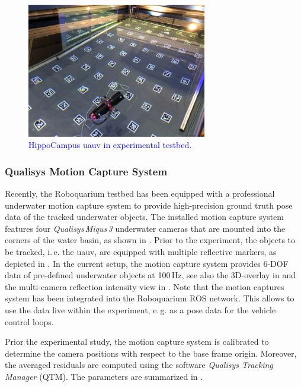 \begin{figure}
    \centering
    \includegraphics[width=0.7\textwidth]{images/04/hippo_in_tank.png}
    \caption{\textcolor{blue}{HippoCampus \ac{uauv} in experimental testbed.}}
    \label{fig:my_label}
\end{figure}


\subsubsection*{Qualisys Motion Capture System}
Recently, the Roboquarium testbed has been equipped with a professional underwater motion capture system to provide high-precision ground truth pose data of the tracked underwater objects.
The installed motion capture system features four \textit{Qualisys\,Miqus\,3} underwater cameras that are mounted into the corners of the water basin, as shown in .
Prior to the experiment, the objects to be tracked, i.\,e. the \ac{uauv}, are equipped with multiple reflective markers, as depicted in . 
In the current setup, the motion capture system provides 6-DOF data of pre-defined underwater objects at 100\,Hz, see also the 3D-overlay in  and the multi-camera reflection intensity view in .
Note that the motion captures system has been integrated into the Roboquarium ROS network.
This allows to use the data live within the experiment, e.\,g. as a pose data for the vehicle control loops.

Prior the experimental study, the motion capture system is calibrated to determine the camera positions with respect to the base frame origin. 
Moreover, the averaged residuals are computed using the software \textit{Qualisys Tracking Manager} (QTM).
The parameters are summarized in .



